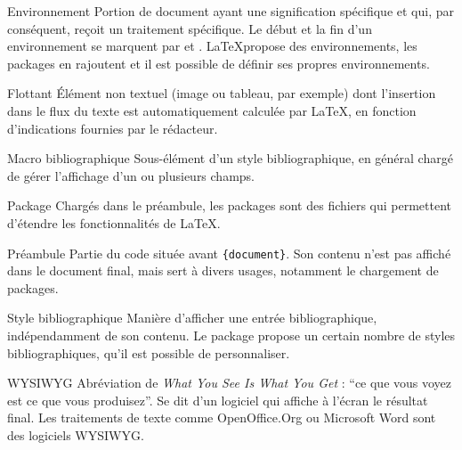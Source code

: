 \begin{glossaire}
\item[Environnement] Portion de document ayant une signification spécifique et qui, par conséquent, reçoit un traitement spécifique. Le début et la fin d'un environnement se marquent par  et . \LaTeX propose des environnements, les packages en rajoutent et il est possible de définir ses propres environnements.

\item[Flottant] Élément non textuel (image ou tableau, par exemple) dont l'insertion dans le flux du texte est automatiquement calculée par \LaTeX, en fonction d'indications fournies par le rédacteur.

\item[Macro bibliographique] Sous-élément d'un style bibliographique, en général chargé de gérer l'affichage d'un ou plusieurs champs.

\item[Package] Chargés dans le préambule, les packages sont des fichiers qui permettent d'étendre les fonctionnalités  de \LaTeX.

\item[Préambule] Partie du code  située avant \verb|{document}|. Son contenu n'est pas affiché dans le document final, mais sert à divers usages, notamment le chargement de packages.

\item[Style bibliographique] Manière d'afficher une entrée bibliographique, indépendamment de son contenu. Le package  propose un certain nombre de styles bibliographiques, qu'il est possible de personnaliser. 

\item[WYSIWYG] Abréviation de \textenglish{\emph{What You See Is What You Get}} : \enquote{ce que vous voyez est ce que vous produisez}. Se dit d'un logiciel qui affiche à l'écran le résultat final. Les traitements de texte comme OpenOffice.Org ou Microsoft Word sont des logiciels WYSIWYG.
\end{glossaire}
